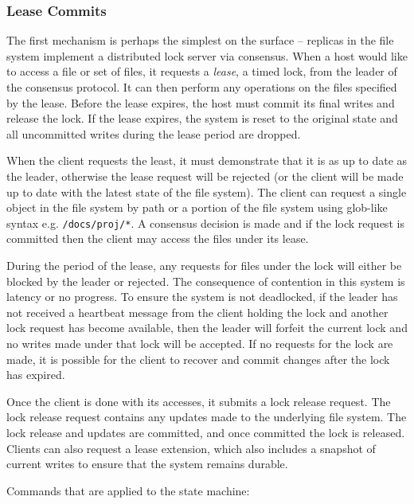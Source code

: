 \documentclass[letterpaper,twocolumn,10pt]{article}
\begin{document}
\subsubsection*{Lease Commits}

The first mechanism is perhaps the simplest on the surface -- replicas in the
file system implement a distributed lock server via consensus.
When a host would like to access a file or set of files, it requests a
\textit{lease}, a timed lock, from the leader of the consensus protocol.
It can then perform any operations on the files specified by the lease.
Before the lease expires, the host must commit its final writes and release
the lock.
If the lease expires, the system is reset to the original state and all
uncommitted writes during the lease period are dropped.

When the client requests the least, it must demonstrate that it is as up to
date as the leader, otherwise the lease request will be rejected (or the
client will be made up to date with the latest state of the file system).
The client can request a single object in the file system by path or a
portion of the file system using glob-like syntax e.g. \texttt{/docs/proj/*}.
A consensus decision is made and if the lock request is committed then the
client may access the files under its lease.

During the period of the lease, any requests for files under the lock will
either be blocked by the leader or rejected.
The consequence of contention in this system is latency or no progress.
To ensure the system is not deadlocked, if the leader has not received a
heartbeat message from the client holding the lock and another lock request
has become available, then the leader will forfeit the current lock and no
writes made under that lock will be accepted.
If no requests for the lock are made, it is possible for the client to
recover and commit changes after the lock has expired.

Once the client is done with its accesses, it submits a lock release request.
The lock release request contains any updates made to the underlying file
system.
The lock release and updates are committed, and once committed the lock is
released.
Clients can also request a lease extension, which also includes a snapshot of
current writes to ensure that the system remains durable.

Commands that are applied to the state machine:
\end{document}
